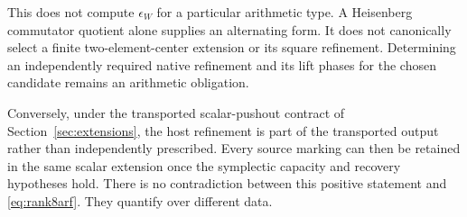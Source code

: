 This does not compute $\epsilon_W$ for a particular arithmetic type. A Heisenberg commutator quotient alone supplies an alternating form. It does not canonically select a finite two-element-center extension or its square refinement. Determining an independently required native refinement and its lift phases for the chosen candidate remains an arithmetic obligation.

Conversely, under the transported scalar-pushout contract of Section~\ref{sec:extensions}, the host refinement is part of the transported output rather than independently prescribed. Every source marking can then be retained in the same scalar extension once the symplectic capacity and recovery hypotheses hold. There is no contradiction between this positive statement and \eqref{eq:rank8arf}. They quantify over different data.

